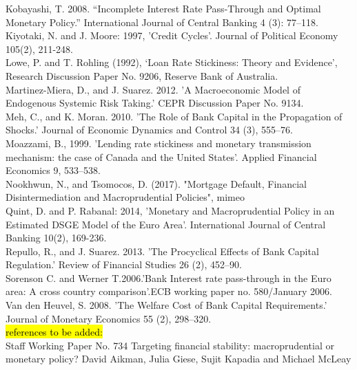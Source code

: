 \documentclass[12pt]{article}
\numberwithin{equation}{section}
\begin{document}
Kobayashi, T. 2008. “Incomplete Interest Rate Pass-Through and
Optimal Monetary Policy.” International Journal of Central
Banking 4 (3): 77–118.\\


Kiyotaki, N. and J. Moore: 1997, 'Credit Cycles'. Journal of Political Economy
105(2), 211-248.\\

Lowe, P. and T. Rohling (1992), ‘Loan Rate Stickiness: Theory and Evidence’, Research Discussion Paper No. 9206, Reserve Bank of Australia.\\

Martinez-Miera, D., and J. Suarez. 2012. 'A Macroeconomic Model
of Endogenous Systemic Risk Taking.' CEPR Discussion Paper
No. 9134.\\

Meh, C., and K. Moran. 2010. 'The Role of Bank Capital in the
Propagation of Shocks.' Journal of Economic Dynamics and
Control 34 (3), 555–76.\\

Moazzami, B., 1999. 'Lending rate stickiness and monetary transmission mechanism: the case of Canada and the United States'.
Applied Financial Economics 9, 533–538.\\

Nookhwun, N., and Tsomocos, D. (2017). "Mortgage Default, Financial Disintermediation and
Macroprudential Policies", mimeo
\\




Quint, D. and P. Rabanal: 2014, 'Monetary and Macroprudential Policy in an Estimated
DSGE Model of the Euro Area'. International Journal of Central Banking
10(2), 169-236.\\


Repullo, R., and J. Suarez. 2013. 'The Procyclical Effects of Bank
Capital Regulation.' Review of Financial Studies 26 (2), 452–90.\\

Sorenson C. and Werner T.2006.'Bank Interest rate pass-through in the Euro area: A cross country comparison'.ECB working paper no. 580/January 2006.\\

Van den Heuvel, S. 2008. 'The Welfare Cost of Bank Capital
Requirements.' Journal of Monetary Economics 55 (2), 298–320.\\


\hl{references to be added:} \\

Staff Working Paper No. 734
Targeting financial stability:
macroprudential or monetary policy?
David Aikman, Julia Giese, Sujit Kapadia and Michael McLeay \\
\end{document}
